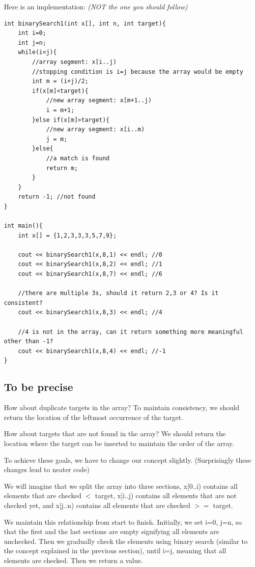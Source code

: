 Here is an implementation: \textit{(NOT the one you should follow)}

\begin{lstlisting}
int binarySearch1(int x[], int n, int target){
    int i=0;
    int j=n;
    while(i<j){
        //array segment: x[i..j)
        //stopping condition is i=j because the array would be empty
        int m = (i+j)/2;
        if(x[m]<target){
            //new array segment: x[m+1..j)
            i = m+1;
        }else if(x[m]>target){
            //new array segment: x[i..m)
            j = m;
        }else{
            //a match is found
            return m;
        }
    }
    return -1; //not found
}

int main(){
    int x[] = {1,2,3,3,3,5,7,9};

    cout << binarySearch1(x,8,1) << endl; //0 
    cout << binarySearch1(x,8,2) << endl; //1
    cout << binarySearch1(x,8,7) << endl; //6

    //there are multiple 3s, should it return 2,3 or 4? Is it consistent?
    cout << binarySearch1(x,8,3) << endl; //4

    //4 is not in the array, can it return something more meaningful other than -1?
    cout << binarySearch1(x,8,4) << endl; //-1
}
\end{lstlisting}

\pagebreak

\subsection*{To be precise}

How about duplicate targets in the array? To maintain consistency, we should return the location of the leftmost occurrence of the target. 

How about targets that are not found in the array? We should return the location where the target can be inserted to maintain the order of the array. 

To achieve these goals, we have to change our concept slightly. (Surprisingly these changes lead to neater code)

We will imagine that we split the array into three sections, x[0..i) contains all elements that are checked $<$ target, x[i..j) contains all elements that are not checked yet, and x[j..n) contains all elements that are checked $>=$ target. 

We maintain this relationship from start to finish. Initially, we set i=0, j=n, so that the first and the last sections are empty signifying all elements are unchecked. Then we gradually check the elements using binary search (similar to the concept explained in the previous section), until i=j, meaning that all elements are checked. Then we return a value.
\vspace{6mm}

